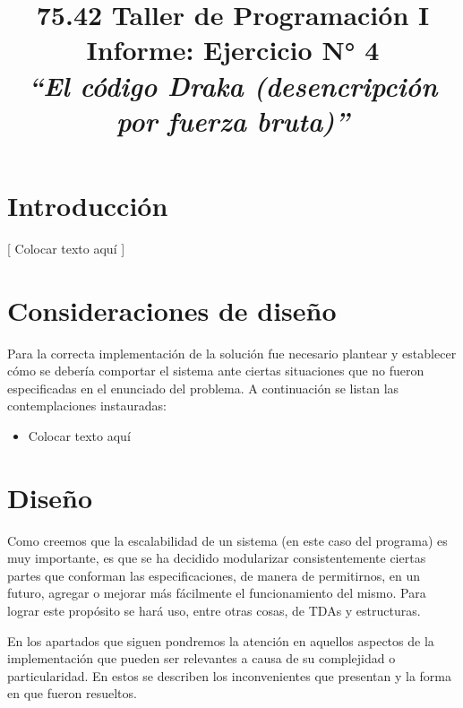 \documentclass{article}
\begin{document}
\title{\Large 75.42 Taller de Programación I \\ 
	  \medskip\Huge Informe: Ejercicio N° 4  \\
	  \bigskip\Large\textit{``El código Draka (desencripción por fuerza bruta)''}}
\date{}
\maketitle




\section{Introducción}
	
	[ Colocar texto aquí ]




\section{Consideraciones de diseño}

	Para la correcta implementación de la solución fue necesario plantear y establecer cómo se debería comportar el sistema ante ciertas situaciones que no fueron especificadas en el enunciado del problema. A continuación se listan las contemplaciones instauradas:

\begin{itemize}
	\itemsep=3pt \topsep=0pt \partopsep=0pt \parskip=0pt \parsep=0pt

	\item Colocar texto aquí

\end{itemize}
\smallskip




\section{Diseño}

	Como creemos que la escalabilidad de un sistema (en este caso del programa) es muy importante, es que se ha decidido modularizar consistentemente ciertas partes que conforman las especificaciones, de manera de permitirnos, en un futuro, agregar o mejorar más fácilmente el funcionamiento del mismo. Para lograr este propósito se hará uso, entre otras cosas, de TDAs y estructuras.
	\par
	En los apartados que siguen pondremos la atención en aquellos aspectos de la implementación que pueden ser relevantes a causa de su complejidad o particularidad. En estos se describen los inconvenientes que presentan y la forma en que fueron resueltos.
\bigskip
\end{document}
